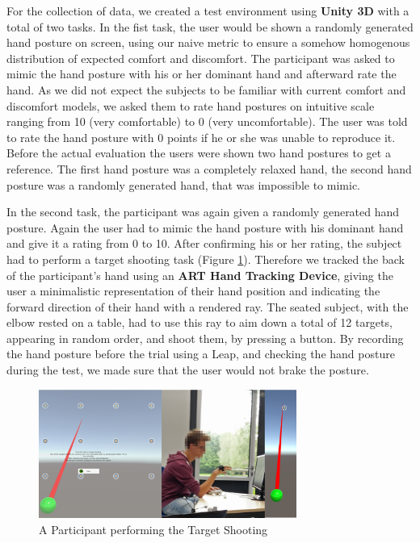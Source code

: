 \documentclass{sig-alternate-05-2015}
\begin{document}
For the collection of data, we created a test environment using \textbf{Unity 3D} with a total of two tasks. In the fist task, the user would be shown a randomly generated hand posture on screen, using our naive metric to ensure a somehow homogenous distribution of expected comfort and discomfort. The participant was asked to mimic the hand posture with his or her dominant hand and afterward rate the hand. As we did not expect the subjects to be familiar with current comfort and discomfort models, we asked them to rate hand postures on intuitive scale ranging from 10 (very comfortable) to 0 (very uncomfortable). The user was told to rate the hand posture with 0 points if he or she was unable to reproduce it. Before the actual evaluation the users were shown two hand postures to get a reference. The first hand posture was a completely relaxed hand, the second hand posture was a randomly generated hand, that was impossible to mimic.

In the second task, the participant was again given a randomly generated hand posture. Again the user had to mimic the hand posture with his dominant hand and give it a rating from 0 to 10. After confirming his or her rating, the subject had to perform a target shooting task (Figure \ref{fig:participant}). Therefore we tracked the back of the participant's hand using an \textbf{ART Hand Tracking Device}, giving the user a minimalistic representation of their hand position and indicating the forward direction of their hand with a rendered ray. The seated subject, with the elbow rested on a table, had to use this ray to aim down a total of 12 targets, appearing in random order, and shoot them, by pressing a button. By recording the hand posture before the trial using a Leap, and checking the hand posture during the test, we made sure that the user would not brake the posture. 

\begin{figure}[h]
\centering
\includegraphics[width=8.45cm]{Participant}
\vspace{-20pt}
\caption{A Participant performing the Target Shooting}
\label{fig:participant}
\vspace{-10pt}
\end{figure}
\end{document}
